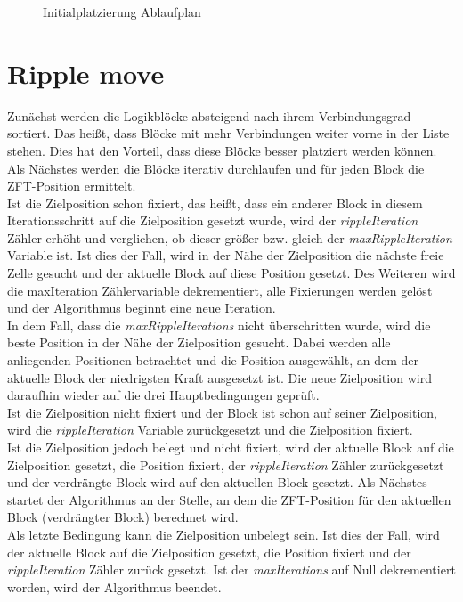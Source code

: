 \begin{figure}[H]
            \caption{Initialplatzierung Ablaufplan}
            \label{fig:init-flowchart}
        \end{figure}

     

    \section{Ripple move}\label{sec:algo}
        Zunächst werden die Logikblöcke absteigend nach ihrem Verbindungsgrad sortiert.
        Das heißt, dass Blöcke mit mehr Verbindungen weiter vorne in der Liste stehen.
        Dies hat den Vorteil, dass diese Blöcke besser platziert werden können.
        Als Nächstes werden die Blöcke iterativ durchlaufen und für jeden Block die ZFT-Position ermittelt.
        \\
        Ist die Zielposition schon fixiert, das heißt, dass ein anderer Block in
        diesem Iterationsschritt auf die Zielposition gesetzt wurde, wird
        der \textit{rippleIteration} Zähler erhöht und verglichen,
        ob dieser größer bzw. gleich der \textit{maxRippleIteration} Variable ist.
        Ist dies der Fall, wird in der Nähe der Zielposition die nächste freie
        Zelle gesucht und der aktuelle Block auf diese Position gesetzt.
        Des Weiteren wird die maxIteration Zählervariable dekrementiert,
        alle Fixierungen werden gelöst und der Algorithmus beginnt eine neue Iteration. 
        \\
        In dem Fall, dass die \textit{maxRippleIterations} nicht überschritten wurde,
        wird die beste Position in der Nähe der Zielposition gesucht.
        Dabei werden alle anliegenden Positionen betrachtet und die Position ausgewählt,
        an dem der aktuelle Block der niedrigsten Kraft ausgesetzt ist.
        Die neue Zielposition wird daraufhin wieder auf die drei Hauptbedingungen geprüft.
        \\
        Ist die Zielposition nicht fixiert und der Block ist schon auf seiner Zielposition,
        wird die \textit{rippleIteration} Variable zurückgesetzt und die Zielposition fixiert.
        \\
        Ist die Zielposition jedoch belegt und nicht fixiert, wird der aktuelle Block
        auf die Zielposition gesetzt, die Position fixiert, der \textit{rippleIteration} Zähler zurückgesetzt
        und der verdrängte Block wird auf den aktuellen Block gesetzt.
        Als Nächstes startet der Algorithmus an der Stelle, an dem die ZFT-Position für den
        aktuellen Block (verdrängter Block) berechnet wird.\\
        Als letzte Bedingung kann die Zielposition unbelegt sein.
        Ist dies der Fall, wird der aktuelle Block auf die Zielposition gesetzt,
        die Position fixiert und der \textit{rippleIteration} Zähler zurück gesetzt.
        Ist der \textit{maxIterations} auf Null dekrementiert worden, wird der Algorithmus beendet.

